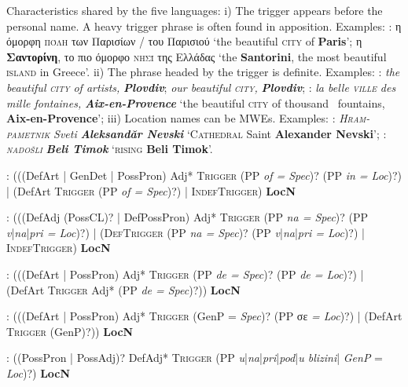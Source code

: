 \documentclass[output=paper]{langsci/langscibook}
\newcommand{\trigger}[1]{\textsc{#1}}
\begin{document}
Characteristics shared by the five languages: i) The trigger appears
before the personal name. A heavy trigger phrase is often found in
apposition. Examples: : η όμορφη \trigger{πόλη} των Παρισίων / του Παρισιού
‘the beautiful \trigger{city} of \textbf{Paris}’; η
\textbf{Σαντορίνη}, το πιο όμορφο
\trigger{νησί} της Ελλάδας ‘the \textbf{Santorini},
the most beautiful \trigger{island} in Greece’. ii) The phrase headed by
the trigger is definite. Examples: : \textit{the beautiful
}\textit{\trigger{city}} \textit{of artists,} \textbf{\textit{Plovdiv}};
\textit{our beautiful }\textit{\trigger{city}}\textit{,}
\textbf{\textit{Plovdiv}}; : \textit{la belle }\textit{\trigger{ville}}
\textit{des mille fontaines,} \textbf{\textit{Aix-en-Provence }}‘the
beautiful \trigger{city} of thousand \ fountains,
\textbf{Aix-en-Provence}’; iii)  Location names can be MWEs. Examples:
: \textit{\trigger{Hram-pametnik}} \textit{Sveti}
\textbf{\textit{Aleksandăr Nevski}} ‘\trigger{Cathedral} Saint
\textbf{Alexander Nevski}’; : \textit{\trigger{nadošli}}
\textbf{\textit{Beli Timok}} ‘\trigger{rising} \textbf{Beli Timok}’.



: (((DefArt | GenDet | PossPron) Adj* \trigger{Trigger} (PP
\textit{of = Spec})? (PP \textit{in = Loc})?) | (DefArt
\trigger{Trigger}\textbf{ }(PP \textit{of = Spec})?) |
\trigger{IndefTrigger}) \textbf{LocN}



: (((DefAdj (PossCL)? | DefPossPron) Adj* \trigger{Trigger} (PP \textit{na
= Spec})? (PP \textit{v}|\textit{na}|\textit{pri = Loc})?) | (\trigger{DefTrigger} (PP
\textit{na = Spec})? (PP \textit{v}|\textit{na}|\textit{pri = Loc})?) |
\trigger{IndefTrigger}) \textbf{LocN}



: (((DefArt | PossPron) Adj* \trigger{Trigger} (PP \textit{de = Spec})?
(PP \textit{de = Loc})?) |
(DefArt\trigger{ Trigger} Adj* (PP
\textit{de = Spec})?)) \textbf{LocN}



: (((DefArt | PossPron) Adj* \trigger{Trigger} (GenP = \textit{Spec})?
(PP σε \textit{= Loc})?) | (DefArt \trigger{Trigger} (GenP)?))
\textbf{LocN}



: ((PossPron | PossAdj)? DefAdj* \trigger{Trigger} (PP
\textit{u}|\textit{na}|\textit{pri}|\textit{pod}|\textit{u blizini}| \textit{GenP} = \textit{Loc})?) \textbf{LocN}
\end{document}
